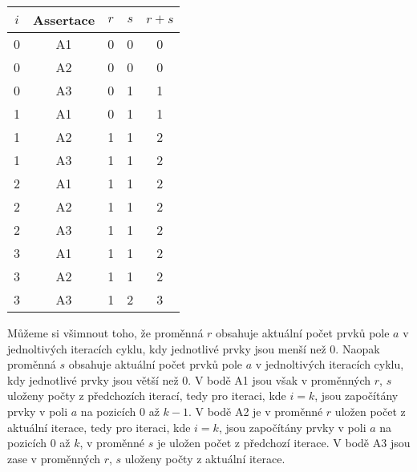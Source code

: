 \documentclass{article}
\begin{document}
\begin{table}[H]\centering
    \begin{tabular}{|c|c|c|c|c|}
        \hline $i$ & \textbf{Assertace} & $r$ & $s$ & $r + s$ \\ \hline \hline
    	0 & A1 & 0 & 0 & 0 \\  \hline
    	0 & A2 & 0 & 0 & 0 \\  \hline
    	0 & A3 & 0 & 1 & 1 \\  \hline
    	1 & A1 & 0 & 1 & 1 \\  \hline
    	1 & A2 & 1 & 1 & 2 \\  \hline
    	1 & A3 & 1 & 1 & 2 \\  \hline
    	2 & A1 & 1 & 1 & 2 \\  \hline
    	2 & A2 & 1 & 1 & 2 \\  \hline
    	2 & A3 & 1 & 1 & 2 \\  \hline
    	3 & A1 & 1 & 1 & 2 \\  \hline
    	3 & A2 & 1 & 1 & 2 \\  \hline
    	3 & A3 & 1 & 2 & 3 \\  \hline
    \end{tabular}
\end{table} 

Můžeme si všimnout toho, že proměnná $r$ obsahuje aktuální počet prvků pole $a$ v jednoltivých iteracích cyklu, kdy jednotlivé prvky jsou menší než 0. Naopak proměnná $s$ obsahuje aktuální počet prvků pole $a$ v jednoltivých iteracích cyklu, kdy jednotlivé prvky jsou větší než 0. V bodě A1 jsou však v proměnných $r$, $s$ uloženy počty z předchozích iterací, tedy pro iteraci, kde $i = k$, jsou započítány prvky v poli $a$ na pozicích 0 až $k - 1$. V bodě A2 je v proměnné $r$ uložen počet z aktuální iterace, tedy pro iteraci, kde $i = k$, jsou započítány prvky v poli $a$ na pozicích 0 až $k$, v proměnné $s$ je uložen počet z předchozí iterace. V bodě A3 jsou zase v proměnných $r$, $s$ uloženy počty z aktuální iterace.
\end{document}

